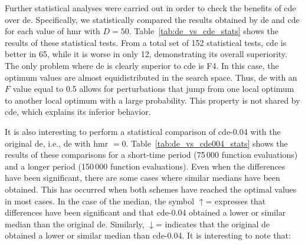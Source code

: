 \documentclass[preprint,3p]{elsarticle}
\newcommand{\CDE}{c{\sc de}}
\newcommand{\DE}{{\sc de}}
\newcommand{\HMR}{{\sc hmr}}
\begin{document}

Further statistical analyses were carried out in order to check the benefits of \CDE{} over \DE{}.
%
Specifically, we statistically compared the results obtained by \DE{} and \CDE{} for each value of \HMR{} with $D = 50$.
%
Table~\ref{tab:de_vs_cde_stats} shows the results of these statistical tests.
%
From a total set of 152 statistical tests, \CDE{} is better in 65, while it is worse in only 12, demonstrating its overall superiority.
%
The only problem where \DE{} is clearly superior to \CDE{} is F4.
%
In this case, the optimum values are almost equidistributed in the search space.
%
Thus, \DE{} with an $F$ value equal to 0.5 allows for perturbations that
jump from one local optimum to another local optimum with a large probability.
%
This property is not shared by \CDE{}, which explains its inferior behavior.



It is also interesting to perform a statistical comparison of \CDE{}-0.04 with the original \DE{}, i.e., \DE{} with \HMR{} $ = 0$.
%
Table~\ref{tab:de_vs_cde004_stats} shows the results of these comparisons
for a short-time period (75$\,$000 function evaluations) and a longer period (150$\,$000 function evaluations).
%
Even when the differences have been significant, there are some cases where similar medians have been obtained.
%
This has occurred when both schemes have reached the optimal values in most cases.
%
In the case of the median, the symbol $\uparrow$= expresses that differences have been significant and that \CDE{}-0.04 obtained
a lower or similar median than the original \DE{}.
%
Similarly, $\downarrow$= indicates that the original \DE{} obtained a lower or similar median than \CDE{}-0.04.
%
It is interesting to note that:
\end{document}
